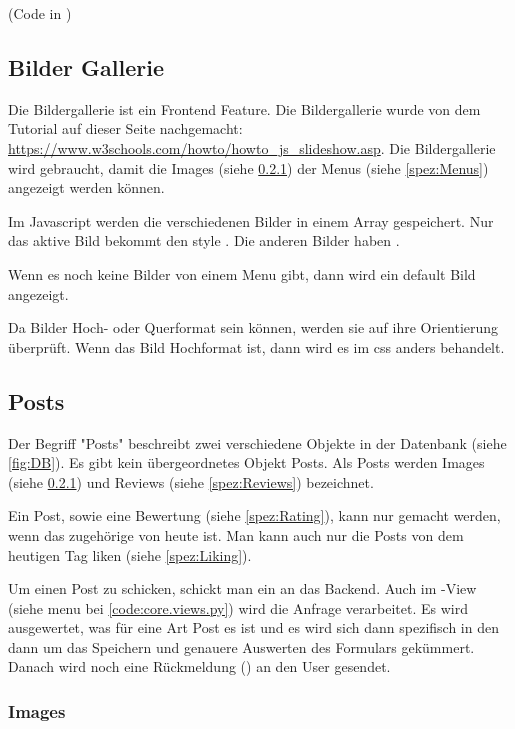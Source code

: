 (Code in )

\subsection{Bilder Gallerie} \label{spez:Gallerie}

Die Bildergallerie ist ein Frontend Feature. Die Bildergallerie wurde von dem
Tutorial auf dieser Seite nachgemacht:
\url{https://www.w3schools.com/howto/howto_js_slideshow.asp}. Die Bildergallerie
wird gebraucht, damit die Images (siehe \ref{spez:Images}) der Menus (siehe
\ref{spez:Menus}) angezeigt werden können.

Im Javascript werden die verschiedenen Bilder in einem Array gespeichert. Nur
das aktive Bild bekommt den style . Die anderen Bilder
haben .

Wenn es noch keine Bilder von einem Menu gibt, dann wird ein default Bild
angezeigt.

Da Bilder Hoch- oder Querformat sein können, werden sie auf ihre Orientierung
überprüft. Wenn das Bild Hochformat ist, dann wird es im css anders
behandelt.

\subsection{Posts} \label{spez:Posts}

Der Begriff "Posts" beschreibt zwei verschiedene Objekte in der Datenbank (siehe
\ref{fig:DB}). Es gibt kein übergeordnetes Objekt Posts. Als Posts werden Images
(siehe \ref{spez:Images}) und Reviews (siehe \ref{spez:Reviews}) bezeichnet.

Ein Post, sowie eine Bewertung (siehe \ref{spez:Rating}), kann nur gemacht
werden, wenn das zugehörige  von heute ist. Man kann auch nur die
Posts von dem heutigen Tag liken (siehe \ref{spez:Liking}).

Um einen Post zu schicken, schickt man ein  an das Backend.
Auch im -View (siehe menu bei {\ref{code:core.views.py}}) wird die
Anfrage verarbeitet. Es wird ausgewertet, was für eine Art Post es ist und es
wird sich dann spezifisch in den  dann um das Speichern
und genauere Auswerten des Formulars gekümmert. Danach wird noch eine
Rückmeldung () an den User gesendet.

\subsubsection{Images} \label{spez:Images}

